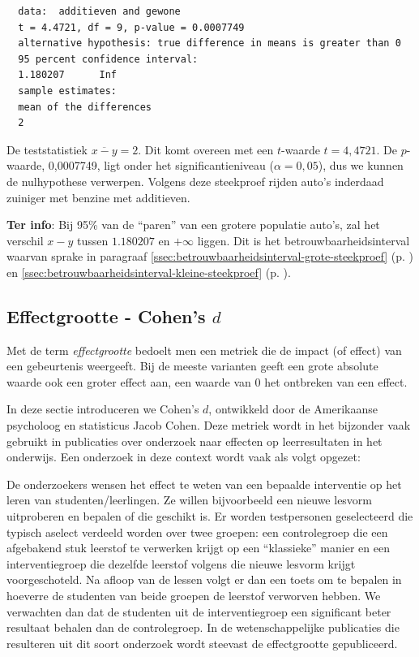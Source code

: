 \begin{example}
\begin{verbatim}
  data:  additieven and gewone
  t = 4.4721, df = 9, p-value = 0.0007749
  alternative hypothesis: true difference in means is greater than 0
  95 percent confidence interval:
  1.180207      Inf
  sample estimates:
  mean of the differences 
  2 
  \end{verbatim}
  
  De teststatistiek $\overline{x-y}=2$. Dit komt overeen met een $t$-waarde $t=4,4721$.
  De $p$-waarde, 0,0007749, ligt onder het significantieniveau ($\alpha=0,05$), dus we kunnen de nulhypothese verwerpen. Volgens deze steekproef rijden auto's inderdaad zuiniger met benzine met additieven.
  
  \textbf{Ter info}: Bij 95\% van de ``paren'' van een grotere populatie auto's,
  zal het verschil $x-y$ tussen $1.180207$ en $+\infty$ liggen.
  Dit is het betrouwbaarheidsinterval waarvan sprake in paragraaf \ref{ssec:betrouwbaarheidsinterval-grote-steekproef} (p. \pageref{ssec:betrouwbaarheidsinterval-grote-steekproef})
  en \ref{ssec:betrouwbaarheidsinterval-kleine-steekproef} (p. \pageref{ssec:betrouwbaarheidsinterval-kleine-steekproef}).
\end{example}

\subsection{Effectgrootte - Cohen's \texorpdfstring{$d$}{d}}
\label{ssec:cohens-d}

Met de term \emph{effectgrootte} bedoelt men een metriek die de impact (of effect) van een gebeurtenis weergeeft. Bij de meeste varianten geeft een grote absolute waarde ook een groter effect aan, een waarde van 0 het ontbreken van een effect.

In deze sectie introduceren we Cohen's $d$, ontwikkeld door de Amerikaanse psycholoog en statisticus Jacob Cohen. Deze metriek wordt in het bijzonder vaak gebruikt in publicaties over onderzoek naar effecten op leerresultaten in het onderwijs. Een onderzoek in deze context wordt vaak als volgt opgezet:

De onderzoekers wensen het effect te weten van een bepaalde interventie op het leren van studenten/leerlingen. Ze willen bijvoorbeeld een nieuwe lesvorm uitproberen en bepalen of die geschikt is. Er worden testpersonen geselecteerd die typisch aselect verdeeld worden over twee groepen: een controlegroep die een afgebakend stuk leerstof te verwerken krijgt op een ``klassieke'' manier en een interventiegroep die dezelfde leerstof volgens die nieuwe lesvorm krijgt voorgeschoteld. Na afloop van de lessen volgt er dan een toets om te bepalen in hoeverre de studenten van beide groepen de leerstof verworven hebben. We verwachten dan dat de studenten uit de interventiegroep een significant beter resultaat behalen dan de controlegroep. In de wetenschappelijke publicaties die resulteren uit dit soort onderzoek wordt steevast de effectgrootte gepubliceerd.

